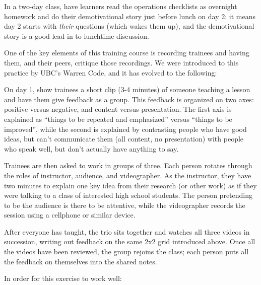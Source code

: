 
In a two-day class, have learners read the operations checklists as
overnight homework and do their demotivational story just before
lunch on day 2: it means day 2 starts with \emph{their} questions
(which wakes them up), and the demotivational story is a good
lead-in to lunchtime discussion.


One of the key elements of this training course is recording trainees
and having them, and their peers, critique those recordings. We were
introduced to this practice by UBC's Warren Code, and it has evolved to
the following:

\begin{genumerate}

\item
  On day 1, show trainees a short clip (3-4 minutes) of someone teaching
  a lesson and have them give feedback as a group. This feedback is
  organized on two axes: positive versus negative, and content versus
  presentation. The first axis is explained as ``things to be repeated
  and emphasized'' versus ``things to be improved'', while the second is
  explained by contrasting people who have good ideas, but can't
  communicate them (all content, no presentation) with people who speak
  well, but don't actually have anything to say.

\item
  Trainees are then asked to work in groups of three. Each person
  rotates through the roles of instructor, audience, and videographer.
  As the instructor, they have two minutes to explain one key idea from
  their research (or other work) as if they were talking to a class of
  interested high school students. The person pretending to be the
  audience is there to be attentive, while the videographer records the
  session using a cellphone or similar device.

\item
  After everyone has taught, the trio sits together and watches all
  three videos in succession, writing out feedback on the same 2x2 grid
  introduced above. Once all the videos have been reviewed, the group
  rejoins the class; each person puts all the feedback on themselves
  into the shared notes.

\end{genumerate}

In order for this exercise to work well:

